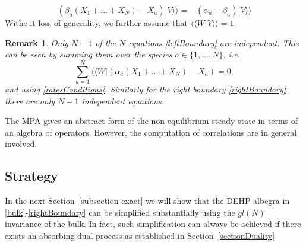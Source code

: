\documentclass[10pt]{article}
\numberwithin{equation}{section}
\numberwithin{equation}{subsection}
\newtheorem{remark}{Remark}
\newcommand{\dt}{\;.}
\begin{document}
\begin{equation}\label{rightBoundary}
	\left(\beta_{a}(X_{1}+\ldots+X_{N})-X_{a}\right) |V\rangle\rangle =-(\alpha_{a}-\beta_{a}) |V\rangle\rangle %
\end{equation}
Without loss of generality, we further assume that $ \langle \langle W|  V\rangle\rangle =1$. 
\begin{remark} Only $N-1$ of the $N$ equations \eqref{leftBoundary}  are independent. This can be seen by summing them over the species $a\in \{1,\ldots,N\}$, i.e.
	\begin{equation}
		\sum_{a=1}^{N}	 \langle \langle W|  \left(\alpha_{a}(X_{1}+\ldots+X_{N})-X_{a}\right)=0,%
	\end{equation}
	and using  \eqref{ratesConditions}.
 Similarly for the right boundary  \eqref{rightBoundary} there are only  $N-1$ independent equations. \end{remark} 
The MPA gives an abstract form of the non-equilibrium steady state in terms of an algebra of operators. However, the computation of  correlations are in general involved. 

\subsection{Strategy}
 In the next Section~\ref{subsection-exact} we will show that the DEHP albegra in \eqref{bulk}-\eqref{rightBoundary} can be simplified substantially using the ${gl}(N)$ invariance of the bulk. In fact, such simplification can always be achieved if 
  there exists an absorbing dual process as established in Section~\ref{sectionDuality}
 
\end{document}
